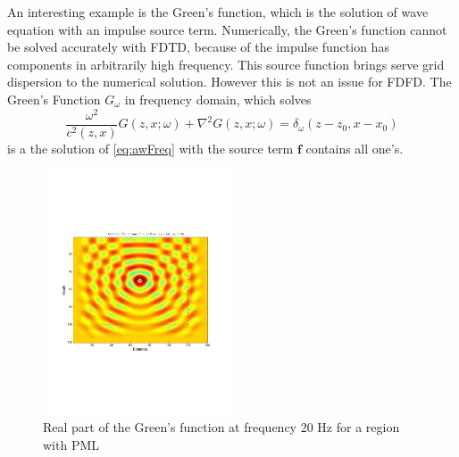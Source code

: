 \documentclass[11pt]{article}
\newcommand{\bff}{\boldsymbol{f}}
\theoremstyle{plain}
\theoremstyle{definition}
\theoremstyle{remark}
\numberwithin{equation}{section}
\begin{document}
An interesting example is the Green's function, which is the solution of wave equation with an impulse source term. Numerically, the Green's function cannot be solved accurately with FDTD, because of the impulse function has components in arbitrarily high
frequency. This source function brings serve grid dispersion to the numerical solution. However this is not an issue for FDFD. The Green's Function 
$G_{\omega}$ in frequency domain, which solves  
  \begin{equation}
  \frac{\omega^2}{c^2(z, x)}G(z, x;\omega) + \nabla^2 G(z, x;\omega) = \delta_{\omega}(z-z_0, x-x_0)
  \end{equation}
  is a the solution of \eqref{eq:awFreq} with the source term $\bff$ contains all one's.
  
\begin{figure}[htbp]
\centering
\includegraphics[width=0.5\textwidth]{Fig/GreensFunction.pdf}
\caption{Real part of the Green's function at frequency 20 Hz for a region with PML} 
\end{figure}
\end{document}
